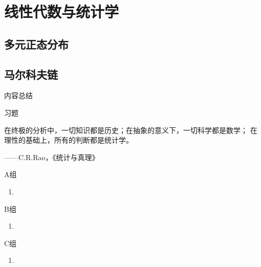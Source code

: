 \chapter{线性代数与统计学}

\section{多元正态分布}

\section{马尔科夫链}

\vspace{2ex} 
\centerline{\heiti \Large 内容总结}

\vspace{2ex} 

\centerline{\heiti \Large 习题}
\vspace{2ex} 
{\kaishu 在终极的分析中，一切知识都是历史；在抽象的意义下，一切科学都是数学；
在理性的基础上，所有的判断都是统计学。}
\begin{flushright}
    \kaishu
	——C.R.Rao，《统计与真理》
\end{flushright}
\centerline{\heiti A组}
\begin{enumerate}
	\item 
\end{enumerate}
\centerline{\heiti B组}
\begin{enumerate}
	\item 
\end{enumerate}
\centerline{\heiti C组}
\begin{enumerate}
	\item 
\end{enumerate}